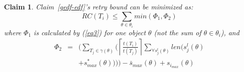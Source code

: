 \documentclass[a4paper,english]{article}
\newtheorem{clm}{Claim}
\begin{document}
\begin{clm}
Claim~\ref{gedf-edf}'s retry bound can be minimized as:
\begin{equation}
RC(T_{i})\le \sum_{\theta\in\theta_{i}}min(\Phi_1 , \Phi_2)\label{eq5}\end{equation}
where $\Phi_1$ is calculated by (\ref{eq3}) for one object $\theta$ (not the sum of $\theta \in \theta_i$),  and 
\begin{eqnarray}
\Phi_2 & = & \Big(\sum_{T_{j}\in\gamma(\theta)} \Big(\left\lceil\frac{t\left(T_{i}\right)}{t\left(T_{j}\right)}\right\rceil\sum_{\forall s_{j}^{l}(\theta)}len \big(s_{j}^{l}(\theta)\nonumber \\
 &  & +s_{max}^{*}(\theta) \big) \Big) \Big)-\bar{s}_{max}(\theta)+s_{i_{max}}(\theta)\label{eq4}\end{eqnarray}
\end{clm}
\end{document}
